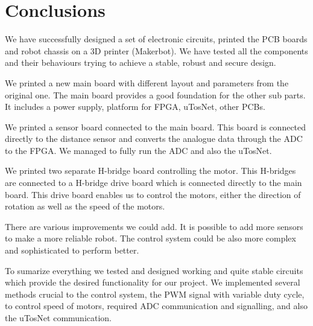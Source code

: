 \chapter{Conclusions}
We have successfully designed a set of electronic circuits, printed the PCB boards and robot chassis on a 3D printer (Makerbot). We have tested all the components and their behaviours trying to achieve a stable, robust and secure design.

We printed a new main board with different layout and parameters from the original one. The main board provides a good foundation for the other sub parts. It includes a power supply, platform for FPGA, uTosNet, other PCBs. 

We printed a sensor board connected to the main board. This board is connected directly to the distance sensor and converts the analogue data through the ADC to the FPGA. We managed to fully run the ADC and also the uTosNet.

 We printed two separate H-bridge board controlling the motor. This H-bridges are connected to a H-bridge drive board which is connected directly to the main board. This drive board enables us to control the motors, either the direction of rotation as well as the speed of the motors.

There are various improvements we could add. It is possible to add more sensors 
to make a more reliable robot. The control system could be also more complex and
sophisticated to perform better. 

 To sumarize everything we tested and designed working and quite stable circuits which provide the desired functionality for our project. We implemented several methods crucial to the control system, the PWM signal with variable duty cycle, to control speed of motors, required ADC communication and signalling, and also the uTosNet communication. 